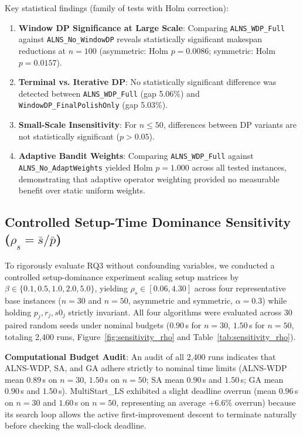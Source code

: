 \documentclass[journal]{IEEEtran}
\begin{document}
Key statistical findings (family of tests with Holm correction):
\begin{enumerate}
    \item \textbf{Window DP Significance at Large Scale}: Comparing \texttt{ALNS\_WDP\_Full} against \texttt{ALNS\_No\_WindowDP} reveals statistically significant makespan reductions at $n=100$ (asymmetric: Holm $p=0.0086$; symmetric: Holm $p=0.0157$).
    \item \textbf{Terminal vs. Iterative DP}: No statistically significant difference was detected between \texttt{ALNS\_WDP\_Full} (gap 5.06\%) and \texttt{WindowDP\_FinalPolishOnly} (gap 5.03\%).
    \item \textbf{Small-Scale Insensitivity}: For $n \le 50$, differences between DP variants are not statistically significant ($p > 0.05$).
    \item \textbf{Adaptive Bandit Weights}: Comparing \texttt{ALNS\_WDP\_Full} against \texttt{ALNS\_No\_AdaptWeights} yielded Holm $p = 1.000$ across all tested instances, demonstrating that adaptive operator weighting provided no measurable benefit over static uniform weights.
\end{enumerate}

\subsection{Controlled Setup-Time Dominance Sensitivity ($\rho_s = \bar{s}/\bar{p}$)}
To rigorously evaluate RQ3 without confounding variables, we conducted a controlled setup-dominance experiment scaling setup matrices by $\beta \in \{0.1, 0.5, 1.0, 2.0, 5.0\}$, yielding $\rho_s \in [0.06, 4.30]$ across four representative base instances ($n=30$ and $n=50$, asymmetric and symmetric, $\alpha=0.3$) while holding $p_j, r_j, s0_j$ strictly invariant. All four algorithms were evaluated across 30 paired random seeds under nominal budgets ($0.90$\,s for $n=30$, $1.50$\,s for $n=50$, totaling 2,400 runs, Figure~\ref{fig:sensitivity_rho} and Table~\ref{tab:sensitivity_rho}).

\textbf{Computational Budget Audit}: An audit of all 2,400 runs indicates that ALNS-WDP, SA, and GA adhere strictly to nominal time limits (ALNS-WDP mean $0.89$\,s on $n=30$, $1.50$\,s on $n=50$; SA mean $0.90$\,s and $1.50$\,s; GA mean $0.90$\,s and $1.50$\,s). MultiStart\_LS exhibited a slight deadline overrun (mean $0.96$\,s on $n=30$ and $1.60$\,s on $n=50$, representing an average $+6.6\%$ overrun) because its search loop allows the active first-improvement descent to terminate naturally before checking the wall-clock deadline.
\end{document}
